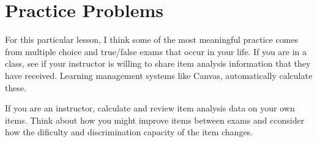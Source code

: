 \documentclass[
  english,
]{book}
\begin{document}
\hypertarget{practice-problems-4}{%
\section{Practice Problems}\label{practice-problems-4}}

For this particular lesson, I think some of the most meaningful practice comes from multiple choice and true/false exams that occur in your life. If you are in a class, see if your instructor is willing to share item analysis information that they have received. Learning management systems like Canvas, automatically calculate these.

If you are an instructor, calculate and review item analysis data on your own items. Think about how you might improve items between exams and cconsider how the dificulty and discrimination capacity of the item changes.

  
\end{document}
